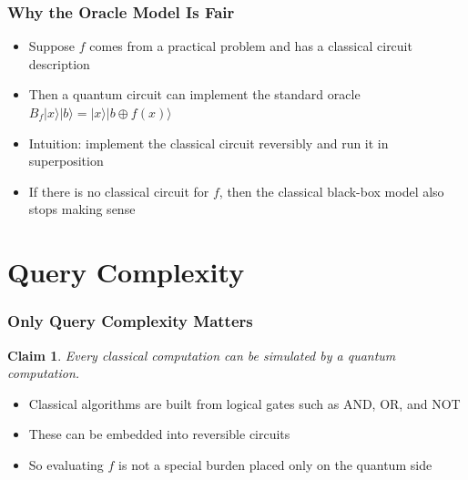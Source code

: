 \documentclass[xcolor=table]{beamer}
\newcommand{\ket}[1]{\lvert #1 \rangle}
\newtheorem{claim}[theorem]{Claim}
\theoremstyle{remark}
\theoremstyle{plain}
\begin{document}
\begin{frame}
  \frametitle{Why the Oracle Model Is Fair}
  \begin{itemize}[<+->]
    \item Suppose $f$ comes from a practical problem and has a classical circuit description
    \item Then a quantum circuit can implement the standard oracle
      $B_f\ket{x}\ket{b} = \ket{x}\ket{b \oplus f(x)}$
    \item Intuition: implement the classical circuit reversibly and run it in superposition
    \item If there is no classical circuit for $f$, then the classical black-box model also stops making sense
  \end{itemize}

  \vspace{0.5cm}

  \vspace{0.3cm}
\end{frame}

\section{Query Complexity}
\begin{frame}
  \frametitle{Only Query Complexity Matters}
  \begin{claim}
    Every classical computation can be simulated by a quantum computation.
  \end{claim}

  \vspace{0.4cm}

  \begin{itemize}[<+->]
    \item Classical algorithms are built from logical gates such as AND, OR, and NOT
    \item These can be embedded into reversible circuits
    \item So evaluating $f$ is not a special burden placed only on the quantum side
  \end{itemize}

  \vspace{0.5cm}
\end{frame}
\end{document}
